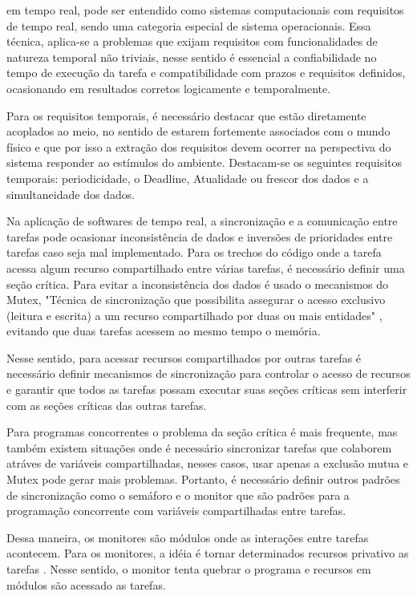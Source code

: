 \documentclass[journal]{IEEEtran}
\begin{document}
 em tempo real, pode ser entendido como sistemas computacionais com requisitos de tempo real, sendo uma categoria especial de sistema operacionais. Essa técnica, aplica-se a problemas que exijam requisitos com funcionalidades de natureza temporal não triviais, nesse sentido é essencial a confiabilidade no tempo de execução da tarefa e compatibilidade com prazos e requisitos definidos, ocasionando em resultados corretos logicamente e temporalmente\cite{IEEEhowto:romulo}.

Para os requisitos temporais, é necessário destacar que estão diretamente acoplados ao meio, no sentido de estarem fortemente associados com o mundo físico e que por isso a extração dos requisitos devem ocorrer na perspectiva do sistema responder ao estímulos do ambiente. Destacam-se os seguintes requisitos temporais:  periodicidade, o Deadline, Atualidade ou frescor dos dados e a simultaneidade dos dados\cite{IEEEhowto:romulo}.

Na aplicação de softwares de tempo real, a sincronização e a comunicação entre tarefas pode ocasionar inconsistência de dados e inversões de prioridades entre tarefas caso seja mal implementado. Para os trechos do código onde a tarefa acessa algum recurso compartilhado entre várias tarefas, é necessário definir uma seção crítica. Para evitar a inconsistência dos dados é usado o mecanismos do Mutex, "Técnica de sincronização que possibilita assegurar o acesso exclusivo (leitura e escrita) a um recurso compartilhado por duas ou mais entidades" \cite{IEEEhowto:Borges}, evitando que duas tarefas acessem ao mesmo tempo o memória. 

Nesse sentido, para acessar recursos compartilhados por outras tarefas é necessário definir mecanismos de sincronização para controlar o acesso de recursos e garantir que todos as tarefas possam executar suas seções críticas sem interferir com as seções críticas das outras tarefas.

Para programas concorrentes o problema da seção crítica é mais frequente, mas também existem  situações onde é necessário sincronizar tarefas que colaborem atráves de variáveis compartilhadas, nesses casos, usar apenas a exclusão mutua e Mutex pode gerar mais problemas. Portanto, é necessário definir outros padrões de sincronização como o semáforo e o monitor que são padrões para a programação concorrente com variáveis compartilhadas entre tarefas.

Dessa maneira, os monitores são módulos onde as interações entre tarefas acontecem. Para os monitores, a idéia é tornar determinados recursos privativo as tarefas \cite{IEEEhowto:romulo}. Nesse sentido, o monitor tenta quebrar o programa e recursos em módulos são acessado as tarefas. 
\end{document}
